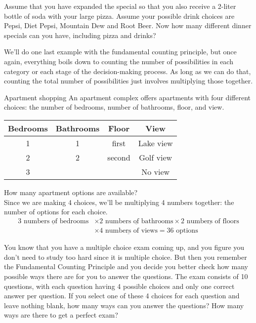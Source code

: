 \begin{try}
Assume that you have expanded the special so that you also receive a 2-liter
bottle of soda with your large pizza. Assume your possible drink choices are Pepsi, Diet
Pepsi, Mountain Dew and Root Beer. Now how many different dinner specials can you have,
including pizza and drinks?
\end{try}

We'll do one last example with the fundamental counting principle, but once again, everything boils down to counting the number of possibilities in each category or each stage of the decision-making process.  As long as we can do that, counting the total number of possibilities just involves multiplying those together.
\vfill
\pagebreak

\begin{example}[https://www.youtube.com/watch?v=oSolXixtUy0]{Apartment shopping}
An apartment complex offers apartments with four different choices: the number of bedrooms, number of bathrooms, floor, and view.
\begin{center}
\begin{tabular}{|c|c|c|c|}\hline
\textbf{Bedrooms} & \textbf{Bathrooms} & \textbf{Floor} & 	\textbf{View} \\ \hline
1 & 1 & first & Lake view \\ \hline
2 & 2 & second & Golf view \\ \hline
3 & & & No view\\ \hline 
\end{tabular} 
\end{center}
How many apartment options are available?\\

\sol
Since we are making 4 choices, we'll be multiplying 4 numbers together: the number of options for each choice.
\begin{align*}\underline{3 \textrm{ numbers of bedrooms}} &\times \underline{2 \textrm{ numbers of bathrooms}} \times \underline{2 \textrm{ numbers of floors}}\\ &\times \underline{4 \textrm{ numbers of views}} = 36 \textrm{ options}\end{align*}
\end{example}

\begin{try}
You know that you have a multiple choice exam coming up, and you figure
you don't need to study too hard since it is multiple choice. But then you remember the
Fundamental Counting Principle and you decide you better check how many possible ways
there are for you to answer the questions. The exam consists of 10 questions, with each
question having 4 possible choices and only one correct answer per question. If you select
one of these 4 choices for each question and leave nothing blank, how many ways can you
answer the questions? How many ways are there to get a perfect exam?
\end{try}

